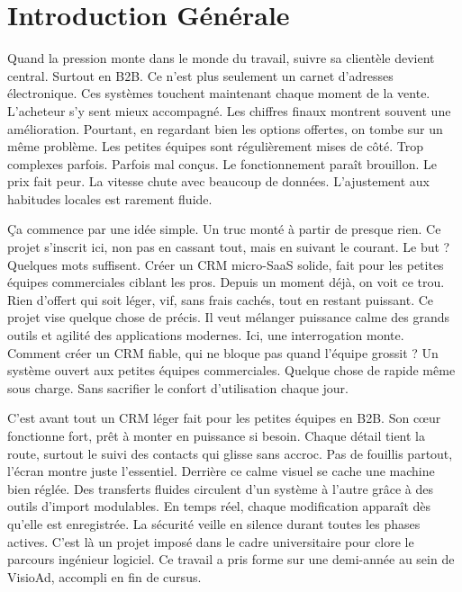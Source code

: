 \chapter*{Introduction Générale}

Quand la pression monte dans le monde du travail, suivre sa clientèle devient central. Surtout en B2B. Ce n’est plus seulement un carnet d’adresses électronique. Ces systèmes touchent maintenant chaque moment de la vente. L’acheteur s’y sent mieux accompagné. Les chiffres finaux montrent souvent une amélioration. Pourtant, en regardant bien les options offertes, on tombe sur un même problème. Les petites équipes sont régulièrement mises de côté. Trop complexes parfois. Parfois mal conçus. Le fonctionnement paraît brouillon. Le prix fait peur. La vitesse chute avec beaucoup de données. L’ajustement aux habitudes locales est rarement fluide.

\vspace{0.5cm}

Ça commence par une idée simple. Un truc monté à partir de presque rien. Ce projet s'inscrit ici, non pas en cassant tout, mais en suivant le courant. Le but ? Quelques mots suffisent. Créer un CRM micro-SaaS solide, fait pour les petites équipes commerciales ciblant les pros. Depuis un moment déjà, on voit ce trou. Rien d’offert qui soit léger, vif, sans frais cachés, tout en restant puissant. Ce projet vise quelque chose de précis. Il veut mélanger puissance calme des grands outils et agilité des applications modernes. Ici, une interrogation monte. Comment créer un CRM fiable, qui ne bloque pas quand l’équipe grossit ? Un système ouvert aux petites équipes commerciales. Quelque chose de rapide même sous charge. Sans sacrifier le confort d’utilisation chaque jour.

\vspace{0.5cm}

C’est avant tout un CRM léger fait pour les petites équipes en B2B. Son cœur fonctionne fort, prêt à monter en puissance si besoin. Chaque détail tient la route, surtout le suivi des contacts qui glisse sans accroc. Pas de fouillis partout, l’écran montre juste l’essentiel. Derrière ce calme visuel se cache une machine bien réglée. Des transferts fluides circulent d’un système à l’autre grâce à des outils d’import modulables. En temps réel, chaque modification apparaît dès qu’elle est enregistrée. La sécurité veille en silence durant toutes les phases actives. C’est là un projet imposé dans le cadre universitaire pour clore le parcours ingénieur logiciel. Ce travail a pris forme sur une demi-année au sein de VisioAd, accompli en fin de cursus.

